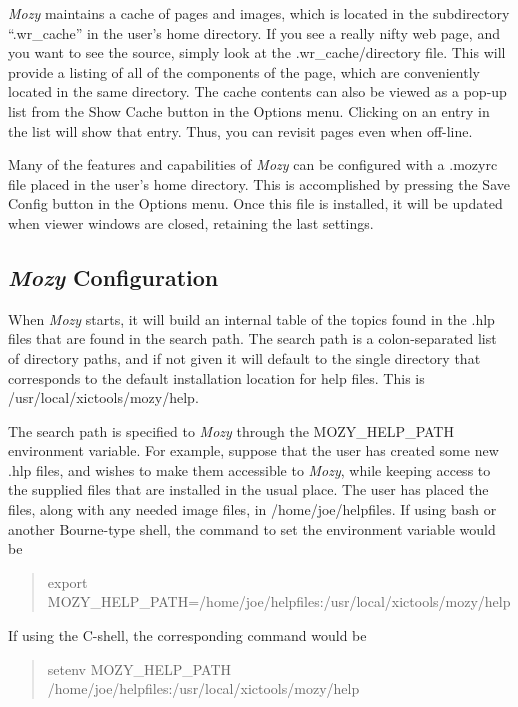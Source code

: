 {\it Mozy} maintains a cache of pages and images, which is located in
the subdirectory ``{\vt .wr\_cache}'' in the user's home directory. 
If you see a really nifty web page, and you want to see the source,
simply look at the {\vt .wr\_cache/directory} file.  This will provide
a listing of all of the components of the page, which are conveniently
located in the same directory.  The cache contents can also be viewed
as a pop-up list from the {\cb Show Cache} button in the {\cb Options}
menu.  Clicking on an entry in the list will show that entry.  Thus,
you can revisit pages even when off-line.

Many of the features and capabilities of {\it Mozy} can be configured
with a {\vt .mozyrc} file placed in the user's home directory.  This
is accomplished by pressing the {\cb Save Config} button in the {\cb
Options} menu.  Once this file is installed, it will be updated when
viewer windows are closed, retaining the last settings.

\subsection{{\it Mozy} Configuration}

When {\it Mozy} starts, it will build an internal table of the topics
found in the {\vt .hlp} files that are found in the search path.  The
search path is a colon-separated list of directory paths, and if not
given it will default to the single directory that corresponds to the
default installation location for help files.  This is {\vt
/usr/local/xictools/mozy/help}.

The search path is specified to {\it Mozy} through the {\vt
MOZY\_HELP\_PATH} environment variable.  For example, suppose that the
user has created some new {\vt .hlp} files, and wishes to make them
accessible to {\it Mozy}, while keeping access to the supplied files
that are installed in the usual place.  The user has placed the files,
along with any needed image files, in {\vt /home/joe/helpfiles}.  If
using {\vt bash} or another Bourne-type shell, the command to set the
environment variable would be

\begin{quote} \vt
export MOZY\_HELP\_PATH=/home/joe/helpfiles:/usr/local/xictools/mozy/help
\end{quote}
If using the C-shell, the corresponding command would be
\begin{quote} \vt
setenv MOZY\_HELP\_PATH /home/joe/helpfiles:/usr/local/xictools/mozy/help
\end{quote}

